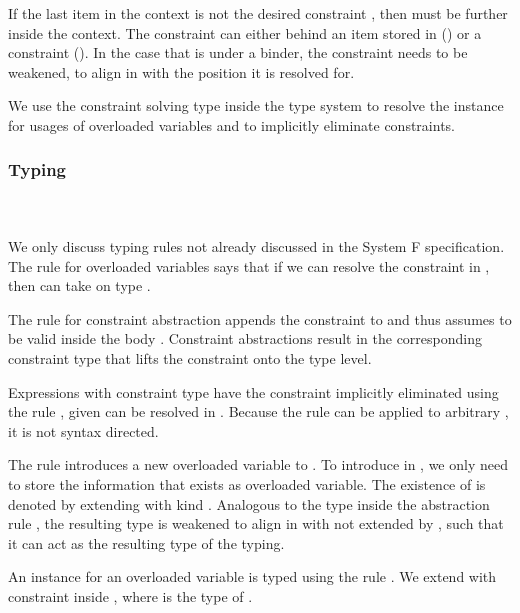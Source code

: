 \noindent If the last item in the context is not the desired constraint , then  must be further inside the context. The constraint can either behind an item stored in  () or a constraint (). In the case that  is under a binder, the constraint needs to be weakened, to align in  with the position it is resolved for.

\noindent We use the constraint solving type inside the type system to resolve the instance for usages of overloaded variables and to implicitly eliminate constraints.

\subsubsection{Typing}\hfill\\\\
We only discuss typing rules not already discussed in the System F specification. 
\FoTyping
The rule for overloaded variables  says that if we can resolve the constraint  \Constr{:}  in , then  can take on type . 

\noindent The rule for constraint abstraction  appends the constraint  to  and thus assumes  to be valid inside the body . Constraint abstractions result in the corresponding constraint type \Constr{[}  \Constr{]⇒}  that lifts the constraint onto the type level.

\noindent Expressions  with constraint type \Constr{[}  \Constr{]⇒}  have the constraint implicitly eliminated using the rule , given  can be resolved in . Because the rule can be applied to arbitrary , it is not syntax directed.

\noindent The rule  introduces a new overloaded variable  to . 
To introduce  in , we only need to store the information that  exists as overloaded variable. The existence of  is denoted by extending  with kind .
Analogous to the type  inside the abstraction rule , the resulting type  is weakened to align in  with  not extended by , such that it can act as the resulting type of the typing.

\noindent An instance for an overloaded variable  is typed using the rule . We extend  with constraint  \Constr{:}  inside , where  is the type of . 


